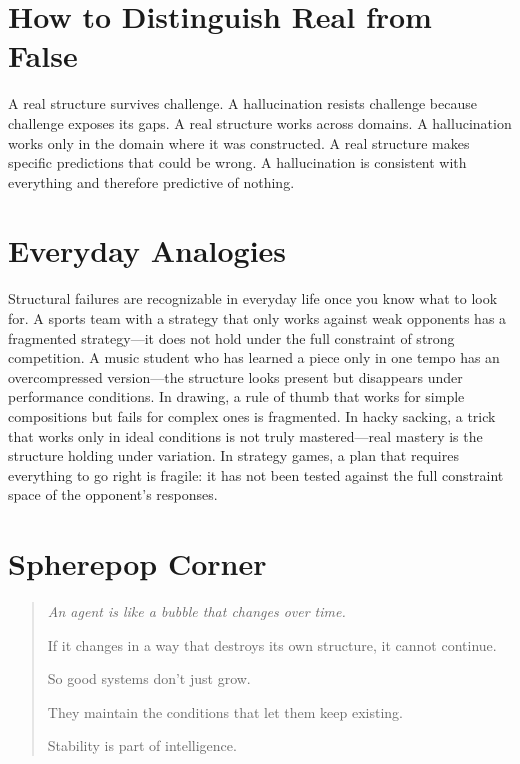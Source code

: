 \documentclass[11pt]{book}
\theoremstyle{definition}
\theoremstyle{remark}
\newenvironment{spherepopjunior}
  {\begin{quote}\small\itshape}
  {\end{quote}}
\begin{document}
\section{How to Distinguish Real from False}

A real structure survives challenge. A hallucination resists challenge
because challenge exposes its gaps. A real structure works across domains.
A hallucination works only in the domain where it was constructed.
A real structure makes specific predictions that could be wrong.
A hallucination is consistent with everything and therefore predictive
of nothing.

\section*{Everyday Analogies}

Structural failures are recognizable in everyday life once you know
what to look for. A sports team with a strategy that only works against
weak opponents has a fragmented strategy---it does not hold under the
full constraint of strong competition. A music student who has learned
a piece only in one tempo has an overcompressed version---the structure
looks present but disappears under performance conditions. In drawing,
a rule of thumb that works for simple compositions but fails for complex
ones is fragmented. In hacky sacking, a trick that works only in ideal
conditions is not truly mastered---real mastery is the structure holding
under variation. In strategy games, a plan that requires everything to
go right is fragile: it has not been tested against the full constraint
space of the opponent's responses.

\section*{Spherepop Corner}

\begin{spherepopjunior}
An agent is like a bubble that changes over time.

If it changes in a way that destroys its own structure, it cannot
continue.

So good systems don't just grow.

They maintain the conditions that let them keep existing.

Stability is part of intelligence.
\end{spherepopjunior}
\end{document}
